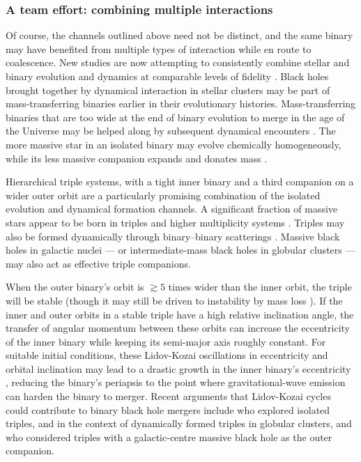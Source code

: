 \documentclass[review]{elsarticle}
\begin{document}
\subsubsection{A team effort: combining multiple interactions}

Of course, the channels outlined above need not be distinct, and the same binary may have benefited from multiple types of interaction while en route to coalescence.   New studies are now attempting to consistently combine stellar and binary evolution and dynamics at comparable levels of fidelity \citep[e.g.,][]{Santoliquido:2020}.  Black holes brought together by dynamical interaction in stellar clusters may be part of mass-transferring binaries earlier in their evolutionary histories.  Mass-transferring binaries that are too wide at the end of binary evolution to merge in the age of the Universe may be helped along by subsequent dynamical encounters \citep[e.g.,][]{Belczynski:2014VMS}.  The more massive star in an isolated binary may evolve chemically homogeneously, while its less massive companion expands and donates mass \citep{Marchant:2017}.  

Hierarchical triple systems, with a tight inner binary and a third companion on a wider outer orbit are a particularly promising combination of the isolated evolution and dynamical formation channels.  A significant fraction of massive stars appear to be born in triples and higher multiplicity systems \citep{DucheneKraus:2013}.  Triples may also be formed dynamically through binary--binary scatterings \citep{MillerHamilton:2002b}.  Massive black holes in galactic nuclei --- or intermediate-mass black holes in globular clusters --- may also act as effective triple companions.   

When the outer binary's orbit is $\gtrsim 5$ times wider than the inner orbit, the triple will be stable (though it may still be driven to instability by mass loss \citep[e.g.,][]{PeretsKratter:2012}).  If the inner and outer orbits in a stable triple have a high relative inclination angle, the transfer of angular momentum between these orbits can increase the eccentricity of the inner binary while keeping its semi-major axis roughly constant. For suitable initial conditions, these Lidov-Kozai oscillations in eccentricity and orbital inclination \citep{Lidov:1962,Kozai:1962} may lead to a drastic growth in the inner binary's eccentricity \citep[for a review, see][]{Naoz:2016}, reducing the binary's periapsis to the point where gravitational-wave emission can harden the binary to merger.  Recent arguments that Lidov-Kozai cycles could contribute to binary black hole mergers include \citet{SilsbeeTremaine:2017} who explored isolated triples, \citet{Antonini:2016} and \citet{Martinez:2020} in the context of dynamically formed triples in globular clusters, and \citet{Hoang:2018} who considered triples with a galactic-centre massive black hole as the outer companion.
\end{document}
